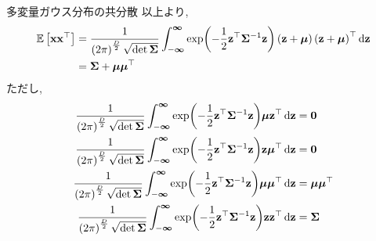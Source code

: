 \documentclass[dvipdfmx,notheorems,t]{beamer}
\begin{document}
\begin{frame}{多変量ガウス分布の共分散}
以上より,
{\small \begin{align*}
  \operatorname{\mathbb{E}} \left[ \vb{x} \vb{x}^\top \right] &=
    \frac{1}{\left( 2\pi \right)^\frac{D}{2} \sqrt{\det \vb{\Sigma}}}
    \int_{-\boldsymbol{\infty}}^{\boldsymbol{\infty}}
    \exp(-\frac{1}{2} \vb{z}^\top \vb{\Sigma}^{-1} \vb{z})
    \left( \vb{z} + \vb*{\mu} \right) \left( \vb{z} + \vb*{\mu} \right)^\top \dd{\vb{z}} \\
  &= \vb{\Sigma} + \vb*{\mu} \vb*{\mu}^\top
\end{align*}}
ただし,
{\small \begin{align*}
  \frac{1}{\left( 2\pi \right)^\frac{D}{2} \sqrt{\det \vb{\Sigma}}}
  \int_{-\boldsymbol{\infty}}^{\boldsymbol{\infty}}
    \exp(-\frac{1}{2} \vb{z}^\top \vb{\Sigma}^{-1} \vb{z})
    \vb*{\mu} \vb{z}^\top \dd{\vb{z}} &= \vb{0} \\
  \frac{1}{\left( 2\pi \right)^\frac{D}{2} \sqrt{\det \vb{\Sigma}}}
  \int_{-\boldsymbol{\infty}}^{\boldsymbol{\infty}}
    \exp(-\frac{1}{2} \vb{z}^\top \vb{\Sigma}^{-1} \vb{z})
    \vb{z} \vb*{\mu}^\top \dd{\vb{z}} &= \vb{0} \\
  \frac{1}{\left( 2\pi \right)^\frac{D}{2} \sqrt{\det \vb{\Sigma}}}
  \int_{-\boldsymbol{\infty}}^{\boldsymbol{\infty}}
    \exp(-\frac{1}{2} \vb{z}^\top \vb{\Sigma}^{-1} \vb{z})
    \vb*{\mu} \vb*{\mu}^\top \dd{\vb{z}} &= \vb*{\mu} \vb*{\mu}^\top \\
  \frac{1}{\left( 2\pi \right)^\frac{D}{2} \sqrt{\det \vb{\Sigma}}}
  \int_{-\boldsymbol{\infty}}^{\boldsymbol{\infty}}
    \exp(-\frac{1}{2} \vb{z}^\top \vb{\Sigma}^{-1} \vb{z})
    \vb{z} \vb{z}^\top \dd{\vb{z}} &= \vb{\Sigma}
\end{align*}}
\end{frame}
\end{document}
